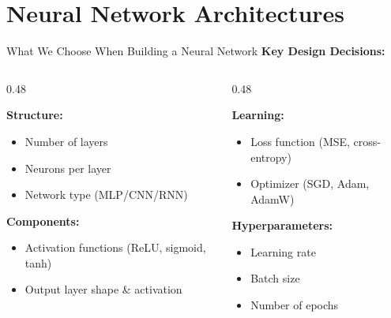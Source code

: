 \section{Neural Network Architectures}
\begin{frame}{What We Choose When Building a Neural Network}
\textbf{Key Design Decisions:}
\vspace{0.5em}

\begin{columns}[t]
\begin{column}{0.48\textwidth}
\begin{tcolorbox}[colback=blue!5, colframe=blue!50, title=\textbf{1. Model Architecture}]
\textbf{Structure:}
\begin{itemize}
\item Number of layers
\item Neurons per layer
\item Network type (MLP/CNN/RNN)
\end{itemize}
\vspace{0.3em}
\textbf{Components:}
\begin{itemize}
\item Activation functions (ReLU, sigmoid, tanh)
\item Output layer shape \& activation
\end{itemize}
\end{tcolorbox}
\end{column}

\begin{column}{0.48\textwidth}
\begin{tcolorbox}[colback=green!5, colframe=green!50!black, title=\textbf{2. Training Strategy}]
\textbf{Learning:}
\begin{itemize}
\item Loss function (MSE, cross-entropy)
\item Optimizer (SGD, Adam, AdamW)
\end{itemize}
\vspace{0.3em}
\textbf{Hyperparameters:}
\begin{itemize}
\item Learning rate
\item Batch size
\item Number of epochs
\end{itemize}
\end{tcolorbox}
\end{column}
\end{columns}
\end{frame}


